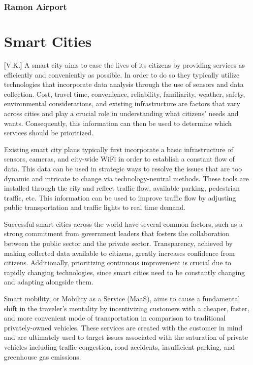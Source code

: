 \documentclass[12pt]{article}                       %
\begin{document}
\subsubsection{Ramon Airport}

\newpage
\section{Smart Cities}[V.K.]
A smart city aims to ease the lives of its citizens by providing services as efficiently and conveniently as possible. In order to do so they typically utilize technologies that incorporate data analysis through the use of sensors and data collection. Cost, travel time, convenience, reliability, familiarity, weather, safety, environmental considerations, and existing infrastructure are factors that vary across cities and play a crucial role in understanding what citizens' needs and wants. Consequently, this information can then be used to determine which services should be prioritized. 

Existing smart city plans typically first incorporate a basic infrastructure of sensors, cameras, and city-wide WiFi in order to establish a constant flow of data. This data can be used in strategic ways to resolve the issues that are too dynamic and intricate to change via technology-neutral methods. These tools are installed through the city and reflect traffic flow, available parking, pedestrian traffic, etc. This information can be used to improve traffic flow by adjusting public transportation and traffic lights to real time demand. 

Successful smart cities across the world have several common factors, such as a strong commitment from government leaders that fosters the collaboration between the public sector and the private sector. Transparency, achieved by making collected data available to citizens, greatly increases confidence from citizens. Additionally, prioritizing continuous improvement is crucial due to rapidly changing technologies, since smart cities need to be constantly changing and adapting alongside them. 

Smart mobility, or Mobility as a Service (MaaS), aims to cause a fundamental shift in the traveler's mentality by incentivizing customers with a cheaper, faster, and more convenient mode of transportation in comparison to traditional privately-owned vehicles. These services are created with the customer in mind and are ultimately used to target issues associated with the saturation of private vehicles including traffic congestion, road accidents, insufficient parking, and greenhouse gas emissions.
\end{document}
